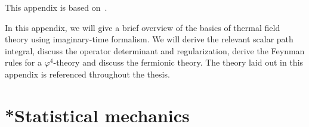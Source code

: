 This appendix is based on~\autocite{kapustaFiniteTemperatureFieldTheory2006,laineBasicsThermalField2016,andersenIntroductionStatisticalMechanics2012}.

In this appendix, we will give a brief overview of the basics of thermal field theory using imaginary-time formalism.
We will derive the relevant scalar path integral, discuss the operator determinant and regularization, derive the Feynman rules for a $\varphi^4$-theory and discuss the fermionic theory.
The theory laid out in this appendix is referenced throughout the thesis.



\section{*Statistical mechanics}
\label{section: statistical mechanics}

